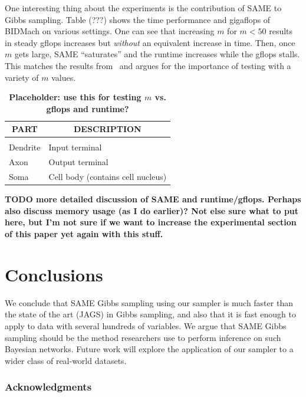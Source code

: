 \documentclass{article} %
\begin{document}
One interesting thing about the experiments is the contribution of SAME to Gibbs sampling.  Table
(???) shows the time performance and gigaflops of BIDMach on various settings. One can see that
increasing $m$ for $m < 50$ results in steady gflops increases but \emph{without} an equivalent
increase in time. Then, once $m$ gets large, SAME ``saturates'' and the runtime increases while the
gflops stalls. This matches the results from~\citep{SAME2015} and argues for the importance of
testing with a variety of $m$ values.

\begin{table}[t]
\caption{\textbf{Placeholder: use this for testing $m$ vs. gflops and runtime?}}
\label{sample-table}
\begin{center}
\begin{tabular}{ll}
\multicolumn{1}{c}{\bf PART}  &\multicolumn{1}{c}{\bf DESCRIPTION}
\\ \hline \\
Dendrite         &Input terminal \\
Axon             &Output terminal \\
Soma             &Cell body (contains cell nucleus) \\
\end{tabular}
\end{center}
\end{table}

\textbf{TODO more detailed discussion of SAME and runtime/gflops. Perhaps also discuss memory usage
(as I do earlier)? Not else sure what to put here, but I'm not sure if we want to increase the
experimental section of this paper yet again with this stuff.}

\section{Conclusions}\label{sec:conclusions}

We conclude that SAME Gibbs sampling using our sampler is much faster than the state of the
art (JAGS) in Gibbs sampling, and also that it is fast enough to apply to data with several hundreds
of variables. We argue that SAME Gibbs sampling should be the method researchers use to perform
inference on such Bayesian networks. Future work will explore the application of our sampler to a
wider class of real-world datasets.


\subsubsection*{Acknowledgments}
\end{document}
